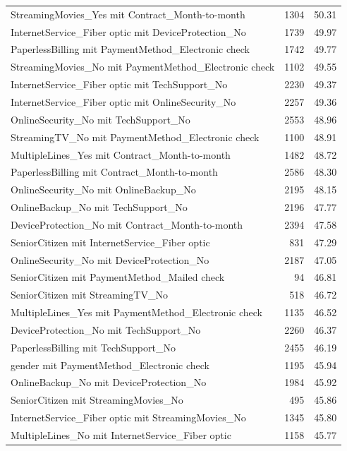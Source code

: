 \documentclass[a4paper,11pt]{article}
\begin{document}
\begin{longtable}{p{9cm}rr}
StreamingMovies\_Yes mit Contract\_Month-to-month & 1304 & 50.31 \\
InternetService\_Fiber optic mit DeviceProtection\_No & 1739 & 49.97 \\
PaperlessBilling mit PaymentMethod\_Electronic check & 1742 & 49.77 \\
StreamingMovies\_No mit PaymentMethod\_Electronic check & 1102 & 49.55 \\
InternetService\_Fiber optic mit TechSupport\_No & 2230 & 49.37 \\
InternetService\_Fiber optic mit OnlineSecurity\_No & 2257 & 49.36 \\
OnlineSecurity\_No mit TechSupport\_No & 2553 & 48.96 \\
StreamingTV\_No mit PaymentMethod\_Electronic check & 1100 & 48.91 \\
MultipleLines\_Yes mit Contract\_Month-to-month & 1482 & 48.72 \\
PaperlessBilling mit Contract\_Month-to-month & 2586 & 48.30 \\
OnlineSecurity\_No mit OnlineBackup\_No & 2195 & 48.15 \\
OnlineBackup\_No mit TechSupport\_No & 2196 & 47.77 \\
DeviceProtection\_No mit Contract\_Month-to-month & 2394 & 47.58 \\
SeniorCitizen mit InternetService\_Fiber optic & 831 & 47.29 \\
OnlineSecurity\_No mit DeviceProtection\_No & 2187 & 47.05 \\
SeniorCitizen mit PaymentMethod\_Mailed check & 94 & 46.81 \\
SeniorCitizen mit StreamingTV\_No & 518 & 46.72 \\
MultipleLines\_Yes mit PaymentMethod\_Electronic check & 1135 & 46.52 \\
DeviceProtection\_No mit TechSupport\_No & 2260 & 46.37 \\
PaperlessBilling mit TechSupport\_No & 2455 & 46.19 \\
gender mit PaymentMethod\_Electronic check & 1195 & 45.94 \\
OnlineBackup\_No mit DeviceProtection\_No & 1984 & 45.92 \\
SeniorCitizen mit StreamingMovies\_No & 495 & 45.86 \\
InternetService\_Fiber optic mit StreamingMovies\_No & 1345 & 45.80 \\
MultipleLines\_No mit InternetService\_Fiber optic & 1158 & 45.77 \\

\end{longtable}
\end{document}
